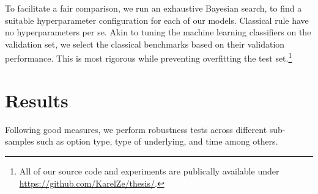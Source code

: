 To facilitate a fair comparison, we run an exhaustive Bayesian search, to find a suitable hyperparameter configuration for each of our models. Classical
rule have no hyperparameters per se. Akin to tuning the machine learning classifiers on the validation set, we select the classical benchmarks based on their validation performance. This is most rigorous while preventing overfitting the test set.\footnote{All of our source code and experiments are publically available under \url{https://github.com/KarelZe/thesis/}.}

\section{Results}

Following good measures, we perform robustness tests across different sub-samples such as option type, type of underlying, and time among others. 


